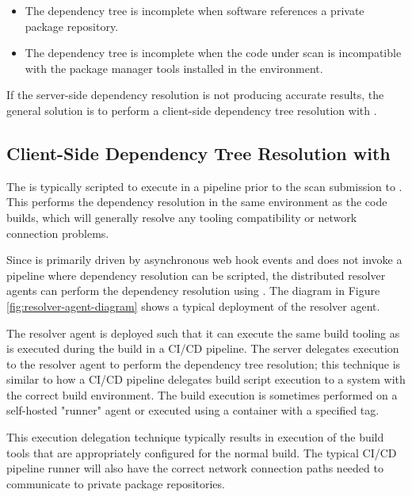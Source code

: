 \begin{itemize}
  \item The dependency tree is incomplete when software references a private package repository.
  \item The dependency tree is incomplete when the code under scan is incompatible with the 
  package manager tools installed in the \cxone environment.
\end{itemize}

If the server-side dependency resolution is not producing accurate results, the general solution is to
perform a client-side dependency tree resolution with \scaresolver. 

\subsection{Client-Side Dependency Tree Resolution with \scaresolvertext}

The \scaresolver is typically scripted to execute in
a pipeline prior to the scan submission to \cxone.  This performs the dependency resolution
in the same environment as the code builds, which will generally resolve any tooling compatibility or network connection
problems.  

Since \cxoneflow is primarily driven by asynchronous web hook events and does not invoke a pipeline
where dependency resolution can be scripted, the distributed resolver agents can perform the dependency resolution using
\scaresolver. The diagram in Figure \ref{fig:resolver-agent-diagram} shows a typical deployment of the resolver agent.  


The resolver agent is deployed such that it can execute the same build tooling as is executed during the build
in a CI/CD pipeline. The \cxoneflow server delegates \scaresolver execution to the resolver agent to perform the dependency tree
resolution; this technique is similar to how a CI/CD pipeline delegates build script execution to a system with the correct
build environment.  The build execution is sometimes performed on a self-hosted "runner" agent or executed using a container with a specified tag. 

This execution delegation technique typically results in execution of the build tools that are appropriately
configured for the normal build.  The typical CI/CD pipeline runner will also have the correct network connection paths
needed to communicate to private package repositories.


